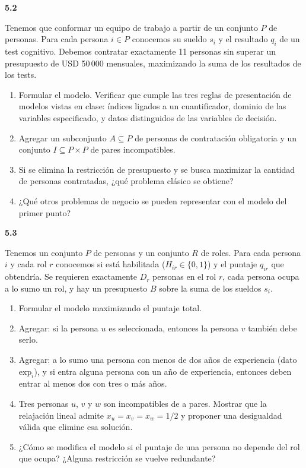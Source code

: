 \documentclass[11pt,a4paper]{article}
\newcommand{\ejercicio}[1]{\par\medskip\noindent\textbf{#1}\par\nopagebreak\smallskip}
\begin{document}
\ejercicio{5.2}
Tenemos que conformar un equipo de trabajo a partir de un conjunto $P$ de
personas. Para cada persona $i \in P$ conocemos su sueldo $s_i$ y el resultado
$q_i$ de un test cognitivo. Debemos contratar exactamente 11 personas sin
superar un presupuesto de USD 50\,000 mensuales, maximizando la suma de los
resultados de los tests.
\begin{enumerate}
  \item Formular el modelo. Verificar que cumple las tres reglas de
  presentación de modelos vistas en clase: índices ligados a un cuantificador,
  dominio de las variables especificado, y datos distinguidos de las variables
  de decisión.
  \item Agregar un subconjunto $A \subseteq P$ de personas de contratación
  obligatoria y un conjunto $I \subseteq P \times P$ de pares incompatibles.
  \item Si se elimina la restricción de presupuesto y se busca maximizar la
  cantidad de personas contratadas, ¿qué problema clásico se obtiene?
  \item ¿Qué otros problemas de negocio se pueden representar con el modelo del
  primer punto?
\end{enumerate}

\ejercicio{5.3}
Tenemos un conjunto $P$ de personas y un conjunto $R$ de roles. Para cada
persona $i$ y cada rol $r$ conocemos si está habilitada ($H_{ir} \in \{0,1\}$) y
el puntaje $q_{ir}$ que obtendría. Se requieren exactamente $D_r$ personas en el
rol $r$, cada persona ocupa a lo sumo un rol, y hay un presupuesto $B$ sobre la
suma de los sueldos $s_i$.
\begin{enumerate}
  \item Formular el modelo maximizando el puntaje total.
  \item Agregar: si la persona $u$ es seleccionada, entonces la persona $v$
  también debe serlo.
  \item Agregar: a lo sumo una persona con menos de dos años de experiencia
  (dato $\mathrm{exp}_i$), y si entra alguna persona con un año de experiencia,
  entonces deben entrar al menos dos con tres o más años.
  \item Tres personas $u$, $v$ y $w$ son incompatibles de a pares. Mostrar que
  la relajación lineal admite $x_u = x_v = x_w = 1/2$ y proponer una desigualdad
  válida que elimine esa solución.
  \item ¿Cómo se modifica el modelo si el puntaje de una persona no depende del
  rol que ocupa? ¿Alguna restricción se vuelve redundante?
\end{enumerate}
\end{document}
